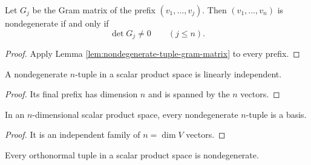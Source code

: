 \begin{lemma}
\label{lem:nondegenerate-tuple-leading-minors}





Let $G_j$ be the Gram matrix of the prefix $(v_1,\ldots,v_j)$. Then
$(v_1,\ldots,v_n)$ is nondegenerate if and only if
\[
\det G_j\ne0\qquad(j\leq n).
\]
\end{lemma}

\begin{proof}

\sketch Apply Lemma \ref{lem:nondegenerate-tuple-gram-matrix} to every prefix.
\end{proof}

\begin{lemma}
\label{lem:nondegenerate-tuple-independent}




A nondegenerate $n$-tuple in a scalar product space is linearly independent.
\end{lemma}

\begin{proof}

\sketch Its final prefix has dimension $n$ and is spanned by the $n$ vectors.
\end{proof}

\begin{lemma}
\label{lem:nondegenerate-tuple-basis}





In an $n$-dimensional scalar product space, every nondegenerate $n$-tuple is a
basis.
\end{lemma}

\begin{proof}

\sketch It is an independent family of $n=\dim V$ vectors.
\end{proof}

\begin{lemma}
\label{lem:orthonormal-tuple-nondegenerate}





Every orthonormal tuple in a scalar product space is nondegenerate.
\end{lemma}

